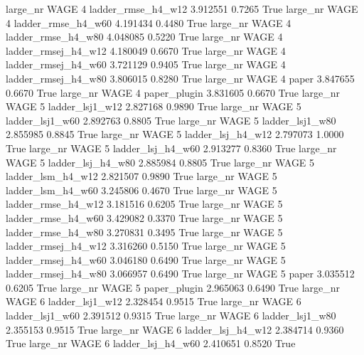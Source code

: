   large_nr     WAGE                 4  ladder_rmse_h4_w12    3.912551      0.7265    True
  large_nr     WAGE                 4  ladder_rmse_h4_w60    4.191434      0.4480    True
  large_nr     WAGE                 4  ladder_rmse_h4_w80    4.048085      0.5220    True
  large_nr     WAGE                 4 ladder_rmsej_h4_w12    4.180049      0.6670    True
  large_nr     WAGE                 4 ladder_rmsej_h4_w60    3.721129      0.9405    True
  large_nr     WAGE                 4 ladder_rmsej_h4_w80    3.806015      0.8280    True
  large_nr     WAGE                 4               paper    3.847655      0.6670    True
  large_nr     WAGE                 4        paper_plugin    3.831605      0.6670    True
  large_nr     WAGE                 5     ladder_lsj1_w12    2.827168      0.9890    True
  large_nr     WAGE                 5     ladder_lsj1_w60    2.892763      0.8805    True
  large_nr     WAGE                 5     ladder_lsj1_w80    2.855985      0.8845    True
  large_nr     WAGE                 5   ladder_lsj_h4_w12    2.797073      1.0000    True
  large_nr     WAGE                 5   ladder_lsj_h4_w60    2.913277      0.8360    True
  large_nr     WAGE                 5   ladder_lsj_h4_w80    2.885984      0.8805    True
  large_nr     WAGE                 5   ladder_lsm_h4_w12    2.821507      0.9890    True
  large_nr     WAGE                 5   ladder_lsm_h4_w60    3.245806      0.4670    True
  large_nr     WAGE                 5  ladder_rmse_h4_w12    3.181516      0.6205    True
  large_nr     WAGE                 5  ladder_rmse_h4_w60    3.429082      0.3370    True
  large_nr     WAGE                 5  ladder_rmse_h4_w80    3.270831      0.3495    True
  large_nr     WAGE                 5 ladder_rmsej_h4_w12    3.316260      0.5150    True
  large_nr     WAGE                 5 ladder_rmsej_h4_w60    3.046180      0.6490    True
  large_nr     WAGE                 5 ladder_rmsej_h4_w80    3.066957      0.6490    True
  large_nr     WAGE                 5               paper    3.035512      0.6205    True
  large_nr     WAGE                 5        paper_plugin    2.965063      0.6490    True
  large_nr     WAGE                 6     ladder_lsj1_w12    2.328454      0.9515    True
  large_nr     WAGE                 6     ladder_lsj1_w60    2.391512      0.9315    True
  large_nr     WAGE                 6     ladder_lsj1_w80    2.355153      0.9515    True
  large_nr     WAGE                 6   ladder_lsj_h4_w12    2.384714      0.9360    True
  large_nr     WAGE                 6   ladder_lsj_h4_w60    2.410651      0.8520    True
